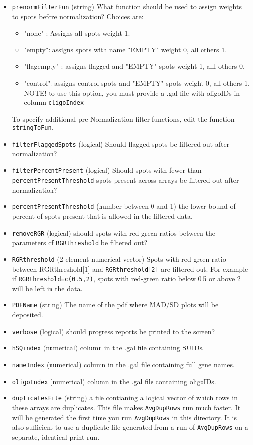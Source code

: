 \documentclass[10pt]{article}
\begin{document}
\begin{itemize}
     	 \item \texttt{prenormFilterFun} (string) What function should be used to assign weights to spots before normalization? Choices are: \begin{itemize}\item "none" : Assigns all spots weight 1. 
\item "empty": assigns spots with name "EMPTY" weight 0, all others 1. 
\item "flagempty" : assigns flagged and "EMPTY" spots weight 1, alll others 0. 
\item "control": assigns control spots and "EMPTY" spots weight 0, all others 1. NOTE! to use this option, you must provide a .gal file with oligoIDs in column \texttt{oligoIndex}\end{itemize} To specify additional pre-Normalization filter functions, edit the function \texttt{stringToFun.} 
     	\item \texttt{filterFlaggedSpots} (logical) Should flagged spots be filtered out after normalization?
     	\item \texttt{filterPercentPresent} (logical) Should spots with fewer than \texttt{percentPresentThreshold} spots present across arrays be filtered out after normalization?
     	\item \texttt{percentPresentThreshold} (number between 0 and 1) the lower bound of percent of spots present that is allowed in the filtered data.
     	\item \texttt{removeRGR} (logical) should spots with red-green ratios between the parameters of \texttt{RGRthreshold} be filtered out?
     	\item \texttt{RGRthreshold} (2-element numerical vector) Spots with red-green ratio between {RGRthreshold[1]} and \texttt{RGRthreshold[2]} are filtered out. For example if \texttt{RGRthreshold=c(0.5,2)}, spots with red-green ratio below 0.5 or above 2 will be left in the data.
     	\item \texttt{PDFName} (string) The name of the pdf where MAD/SD plots will be deposited. 
     	\item \texttt{verbose} (logical) should progress reports be printed to the screen?
     	\item \texttt{hSQindex} (numerical) column in the .gal file containing SUIDs. 
     	\item \texttt{nameIndex} (numerical) column in the .gal file containing full gene names.
      	\item \texttt{oligoIndex} (numerical) column in the .gal file containing oligoIDs.
     	\item \texttt{duplicatesFile} (string) a file contianing a logical vector of which rows in these arrays are duplicates. This file makes \texttt{AvgDupRows} run much faster. It will be generated the first time you run \texttt{AvgDupRows} in this directory. It is also sufficient to use a duplicate file generated from a run of \texttt{AvgDupRows} on a separate, identical print run.    	     	     	     	     	     	     	     	     	     	     	
     \end{itemize}
\end{document}
